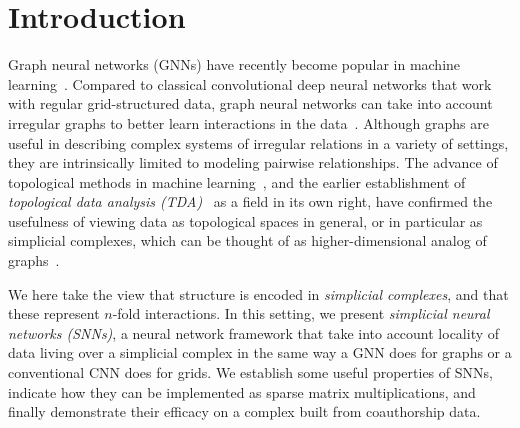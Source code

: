 \section{Introduction}

Graph neural networks (GNNs) have recently become popular in machine learning~\cite{defferrard2016convolutional, bronstein2017geometric, wu2020survey}.
Compared to classical convolutional deep neural networks that work with regular grid-structured data, graph neural networks can take into account irregular graphs to better learn interactions in the data~\cite{battaglia2018relational}. Although graphs are useful in describing complex systems of irregular relations in a variety of settings, they are intrinsically limited to modeling pairwise relationships. The advance of topological methods in machine learning~\cite{Gabrielsson2020topological, Hofer2019LearningRO, rieck2018neural}, and the earlier establishment of \emph{topological data analysis (TDA)}~\cite{carlsson2008,chazal2017,edelsbrunner2010computational,ghrist2008barcodes} as a field in its own right, have confirmed the usefulness of viewing data as topological spaces in general, or in particular as simplicial complexes, which can be thought of as higher-dimensional analog of graphs~\cite{moore2012,patania2017}.

We here take the view that structure is encoded in \emph{simplicial complexes}, and that these represent $n$-fold interactions. In this setting, we present \emph{simplicial neural networks (SNNs)}, a neural network framework that take into account locality of data living over a simplicial complex in the same way a GNN does for graphs or a conventional CNN does for grids.
We establish some useful properties of SNNs, indicate how they can be implemented as sparse matrix multiplications, and finally demonstrate their efficacy on a complex built from coauthorship data.

